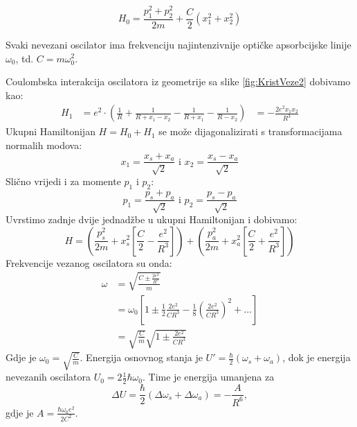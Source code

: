 \documentclass{article}
\numberwithin{equation}{section}
\begin{document}
\begin{equation}
    H_0=\frac{p^2_1+p^2_2}{2m}+ \frac{C}{2}(x^2_1+x^2_2)
    \label{EQ3_1}
\end{equation}

Svaki nevezani oscilator ima frekvenciju najintenzivnije optičke apsorbcijske linije $\omega_0$, td. $C=m \omega^2_0$.

Coulombska interakcija oscilatora iz geometrije sa slike \ref{fig:KristVeze2} dobivamo kao: 
\begin{equation}
\begin{split}
    H_1&=e^2 \cdot (\frac{1}{R}+\frac{1}{R+x_1-x_2}-\frac{1}{R+x_1}-\frac{1}{R-x_2})
    &=-\frac{2e^2x_1 x_2}{R^3}
\end{split}
    \label{EQ3_2}
\end{equation}
Ukupni Hamiltonijan $H=H_0+H_1$ se može dijagonalizirati s transformacijama normalih modova: 
\begin{equation}
    x_1=\frac{x_s+x_a}{\sqrt{2}}\text{ i } x_2=\frac{x_s-x_a}{\sqrt{2}}
\end{equation}
Slično vrijedi i za momente $p_1$ i $p_2$:
\begin{equation}
    p_1=\frac{p_s+p_a}{\sqrt{2}}\text{ i } p_2=\frac{p_s-p_a}{\sqrt{2}}
\end{equation}
Uvrstimo zadnje dvije jednadžbe u ukupni Hamiltonijan i dobivamo: 
\begin{equation}
    H=\left(\frac{p^2_s}{2m}+x^2_s\left[\frac{C}{2}-\frac{e^2}{R^3} \right]  \right)+ \left( \frac{p^2_a}{2m}+x^2_a\left[\frac{C}{2}+ \frac{e^2}{R^3}\right] \right)
\end{equation}
Frekvencije vezanog oscilatora su onda: 
\begin{equation}
\begin{split}
      \omega &= \sqrt{\frac{C \pm \frac{2e^2}{R^3}}{m}}\\
      &=\omega_0\left[1\pm\frac{1}{2}\frac{2e^2}{CR^3}-\frac{1}{8}\left(\frac{2e^2}{CR^3}\right)^2+... \right]\\
      &= \sqrt{\frac{C}{m}}\sqrt{1\pm \frac{2e^2}{CR^3}}
\end{split}
  \label{EQ3_3}
\end{equation}
Gdje je $\omega_0 = \sqrt{\frac{C}{m}}$. Energija osnovnog stanja je $U'=\frac{\hbar}{2}(\omega_s+\omega_a)$, dok je energija nevezanih oscilatora $U_0=2\frac{1}{2}\hbar \omega_0$. Time je energija umanjena za 
\begin{equation}
\Delta U = \frac{\hbar}{2}(\Delta \omega_s + \Delta \omega_a)= -\frac{A}{R^6},
\label{EQ3_4}
\end{equation}
gdje je $A=\frac{\hbar \omega_0 e^2}{2C^2}$.
\newpage
\end{document}

